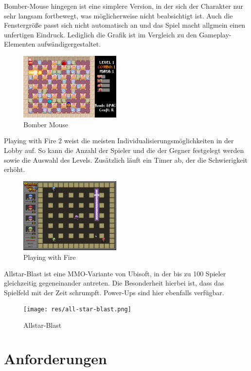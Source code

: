 \documentclass[conference]{IEEEtran}
\begin{document}
Bomber-Mouse \cite{bombermouse} hingegen ist eine simplere Version, in der sich der Charakter nur sehr langsam fortbewegt, was möglicherweise nicht beabsichtigt ist. Auch die Fenstergröße passt sich nicht automatisch an und das Spiel macht allgmein einen unfertigen Eindruck. Lediglich die Grafik ist im Vergleich zu den Gameplay-Elementen aufwändigergestaltet.
\begin{figure}[H]
    \centering
    \includegraphics[width=0.45\textwidth]{res/bombermouse.png}
    \caption{Bomber Mouse}
\end{figure}
Playing with Fire 2 \cite{playingwithfire} weist die meisten Individualisierungsmöglichkeiten in der Lobby auf. So kann die Anzahl der Spieler und die der Gegner festgelegt werden sowie die Auswahl des Levels. Zusätzlich läuft ein Timer ab, der die Schwierigkeit erhöht. 
\begin{figure}[H]
    \centering
    \includegraphics[width=0.45\textwidth]{res/playing-with-fire.png}
    \caption{Playing with Fire}
\end{figure}


Allstar-Blast \cite{allstarblast} ist eine MMO-Variante von Ubisoft, in der bis zu 100 Spieler gleichzeitig gegeneinander antreten. Die Besonderheit hierbei ist, dass das Spielfeld mit der Zeit schrumpft. Power-Ups sind hier ebenfalls verfügbar.
\begin{figure}[H]
    \centering
    \texttt{[image: res/all-star-blast.png]}
    \caption{Allstar-Blast}
\end{figure}


\section{Anforderungen}
\end{document}
